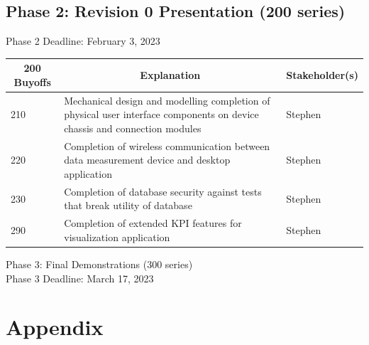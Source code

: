 \documentclass[12pt]{article}
\begin{document}
\newpage
\noindent
\subsection{Phase 2: Revision 0 Presentation (200 series)}
Phase 2 Deadline: February 3, 2023\\

\begin{table}[H]
  \centering
  \begin{tabular}{|p{2cm}|p{10cm}|p{2cm}|}
  \hline
  \multicolumn{1}{|c|}{\textbf{200 Buyoffs}} & \multicolumn{1}{c|}{\textbf{Explanation}} & \multicolumn{1}{|c|}{\textbf{Stakeholder(s)}}
  \\ \hline
  210
  & Mechanical design and modelling completion of physical user interface components on device chassis and connection modules
  & Stephen
  \newline                                
  \\ \hline

  220                              
  & Completion of wireless communication between data measurement device and desktop application 
  & Stephen
  \newline                                
  \\ \hline

  230                          
  & Completion of database security against tests that break utility of database
  & Stephen
  \newline                                
  \\ \hline

  290                                
  & Completion of extended KPI features for visualization application
  & Stephen 
  \newline                            
  \\ \hline

  \end{tabular}
\end{table}
\newpage

\noindent
Phase 3: Final Demonstrations (300 series)\\
Phase 3 Deadline: March 17, 2023\\


\section{Appendix}
\end{document}
